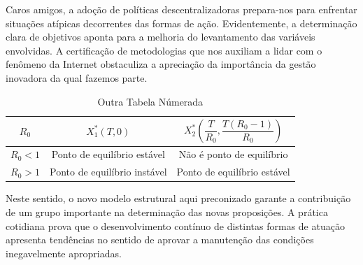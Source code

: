 \documentclass[fleqn]{profmat-cefet}
\begin{document}
Caros amigos, a adoção de políticas descentralizadoras prepara-nos para enfrentar
situações atípicas decorrentes das formas de ação. Evidentemente, a determinação
clara de objetivos aponta para a melhoria do levantamento das variáveis
envolvidas. A certificação de metodologias que nos auxiliam a lidar com o
fenômeno da Internet obstaculiza a apreciação da importância da gestão inovadora
da qual fazemos parte. 

\begin{table}
  \begin{center}
    \caption{Outra Tabela Númerada}
    \label{tab:outra_tabela_numerada}
    \begin{tabular}{|c|c|c|}
    	\hline
    	$\displaystyle R_0$ & $\displaystyle X_1^* (T,0)$  & $\displaystyle X_2^* \left( \dfrac{T}{R_0}, \dfrac{T(R_0-1)}{R_0}\right)$ \rule[-3ex]{0pt}{7.3ex} \\ \hline\hline
    	      $R_0<1$       & Ponto de equilíbrio estável  &                         Não é ponto de equilíbrio   \rule[-2ex]{0pt}{5ex}                         \\
    	      $R_0>1$       & Ponto de equilíbrio instável &                         Ponto de equilíbrio estável \rule[-2ex]{0pt}{3ex}                         \\ \hline
    \end{tabular}
  \end{center}
\end{table}

Neste sentido, o novo modelo estrutural aqui preconizado garante a contribuição
de um grupo importante na determinação das novas proposições. A prática
cotidiana prova que o desenvolvimento contínuo de distintas formas de atuação
apresenta tendências no sentido de aprovar a manutenção das condições
inegavelmente apropriadas. 
\end{document}
